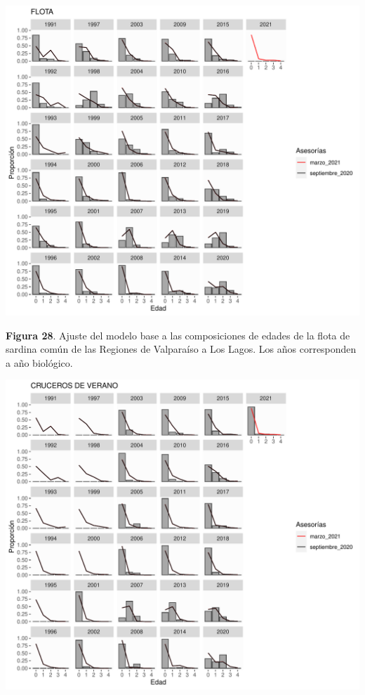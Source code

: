 \documentclass[
  spanish,
]{article}
\begin{document}
\begin{center}\includegraphics{FigurasInforme_Marzo/Fig28_ajustesCompF-1} \end{center}

\vspace{-0.5cm}
\small

\textbf{Figura 28}. Ajuste del modelo base a las composiciones de edades
de la flota de sardina común de las Regiones de Valparaíso a Los Lagos.
Los años corresponden a año biológico. \vspace{0.3cm} \normalsize

\begin{center}\includegraphics{FigurasInforme_Marzo/Fig29_ajustesCompR-1} \end{center}
\end{document}

